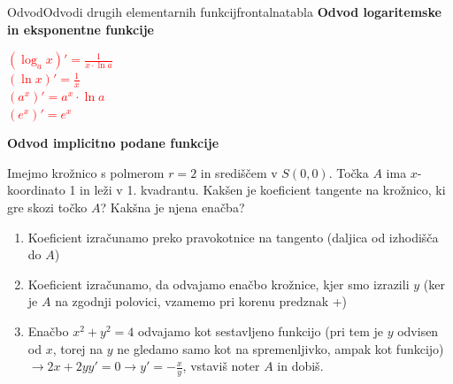 \begin{priprava}{}{}{Odvod}{Odvodi drugih elementarnih funkcij}{frontalna}{tabla}
\textbf{Odvod logaritemske in eksponentne funkcije}

\textcolor{red}{
    $ (\log_a x)' = \frac{1}{x \cdot \ln a} $  \\
    $ (\ln x)' = \frac{1}{x} $  \\
    $ (a^x)' = a^x \cdot \ln a $ \\
    $ (e^x)' = e^x $ 
}


\textbf{Odvod implicitno podane funkcije}

Imejmo krožnico s polmerom $ r = 2 $ in središčem v $ S(0, 0) $. Točka $ A $ ima $ x $-koordinato 1 in leži v 1. kvadrantu. Kakšen je koeficient tangente na krožnico, ki gre skozi točko $ A $? Kakšna je njena enačba? 
\begin{enumerate}
    \item Koeficient izračunamo preko pravokotnice na tangento (daljica od izhodišča do $ A $)
    \item Koeficient izračunamo, da odvajamo enačbo krožnice, kjer smo izrazili $ y $ (ker je $ A $ na zgodnji polovici, vzamemo pri korenu predznak +)
    \item Enačbo $ x^2 + y^2 = 4 $ odvajamo kot sestavljeno funkcijo (pri tem je $ y $ odvisen od $ x $, torej na $ y $ ne gledamo samo kot na spremenljivko, ampak kot funkcijo) $ \rightarrow 2x + 2 y y' = 0 \rightarrow y' = - \frac{x}{y} $, vstaviš noter $ A $ in dobiš.
\end{enumerate}

    
\end{priprava}